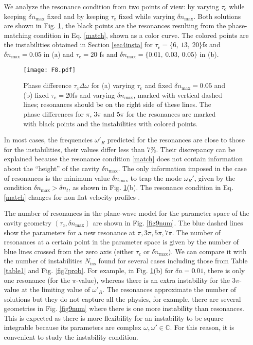 \documentclass[aps,pra,reprint,amsmath,amssymb,showpacs,groupedaddress,floatfix]{revtex4-1}
\begin{document}
We analyze the resonance condition from two points of view: by varying $\tau_\text{c}$ while keeping $\delta n_\text{max}$ fixed and by keeping $\tau_\text{c}$ fixed while varying  $\delta n_\text{max}$. Both solutions are shown in Fig. \ref{fig8diff}, the black points are the resonances resulting from the phase-matching condition in Eq. \eqref{match}, shown as a color curve. The colored points are the instabilities obtained in Section \ref{sec4insta} for $\tau_\text{c}=\{6,\ 13,\ 20\}$fs and  $\delta n_\text{max}=0.05$ in (a) and $\tau_\text{c}=20$ fs and $\delta n_\text{max}=\{0.01,\ 0.03,\ 0.05\}$ in (b).

\begin{figure}\centering
	\texttt{[image: F8.pdf]}
	\caption{Phase difference $\tau_\text{c}\Delta \omega $ for (a) varying $\tau_\text{c}$ and fixed $\delta n_{\text{max}}=0.05$ and (b) fixed $\tau_\text{c}=20$fs and varying $\delta n_{\text{max}}$, marked with vertical dashed lines; resonances should be on the right side of these lines. The phase differences for $\pi$, $3\pi$ and $5\pi$ for the resonances are marked with black points and the instabilities with colored points.}
	\label{fig8diff}  
\end{figure}

In most cases, the frequencies $\omega'_R$ predicted for the resonances are close to those for the instabilities, their values differ less than $7\%$. Their discrepancy can be explained because the resonance condition \eqref{match} does not contain information about the ``height'' of the cavity $\delta n_\text{max}$. The only information imposed in the case of resonances is the minimum value $\delta n_\text{max}$ to trap the mode $\omega_R'$, given by the condition $\delta n_{\text{max}}>\delta n_{t}$, as shown in Fig. \ref{fig8diff}(b). The resonance condition in Eq. \eqref{match} changes for non-flat velocity profiles \cite{GaonaReyes2017,michel2013saturation}.

The number of resonances in the plane-wave model for the parameter space of the cavity geometry $(\tau_\text{c},\delta n_{\text{max}})$ are shown in Fig. \ref{fig9num}. The blue dashed lines show the parameters for a new resonance at $\pi,3\pi, 5\pi,7\pi$. The number of resonances at a certain point in the parameter space is given by the number of blue lines crossed from the zero axis (either $\tau_c$ or $\delta n_\text{max}$). We can compare it with the number of instabilities $N_\text{ins}$ found for several cases including those from Table \ref{table1} and Fig. \ref{fig7prob}. For example, in Fig. \ref{fig8diff}(b) for $\delta n=0.01$, there is only one resonance (for the $\pi$-value), whereas there is an extra instability for the $3\pi$-value at the limiting value of $\omega'_R$. The resonances approximate the number of solutions but they do not capture all the physics, for example, there are several geometries in Fig. \ref{fig9num} where there is one more instability than resonances. This is expected as there is more flexibility for an instability to be square-integrable because its parameters are complex $\omega,\omega'\in\mathbb{C}$. For this reason, it is convenient to study the instability condition.
\end{document}
